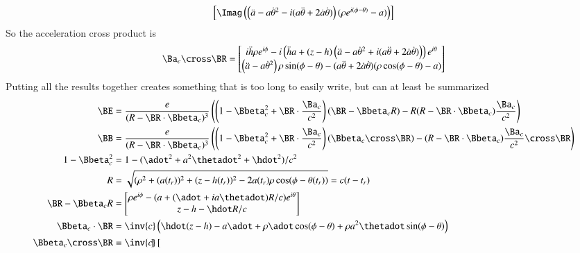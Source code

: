 {\begin{equation}
\begin{aligned}
\begin{bmatrix}
\Imag \left(
\left( \ddot{a} - a {\dot{\theta}}^2 - i ( a\ddot{\theta} + 2 \dot{a} \dot{\theta} ) \right) ( \rho e^{i(\phi -\theta)} - a )
\right)
\end{bmatrix} \\
\end{aligned}
\end{equation}
%
So the acceleration cross product is
%
\begin{equation}\label{eqn:relativisticElectrodynamicsExamReflection:980}
\Ba_c \cross \BR
=
\begin{bmatrix}
i \ddot{h} \rho e^{i\phi}
- i \left( \ddot{h} a + (z - h) \left( \ddot{a} - a {\dot{\theta}}^2 + i ( a\ddot{\theta} + 2 \dot{a} \dot{\theta} ) \right) \right) e^{i\theta} \\
\left( \ddot{a} - a {\dot{\theta}}^2 \right) \rho \sin(\phi - \theta)
-( a\ddot{\theta} + 2 \dot{a} \dot{\theta} ) (\rho \cos(\phi -\theta) - a)
\end{bmatrix}
\end{equation}
%
Putting all the results together creates something that is too long to easily write, but can at least be summarized
%
\begin{equation}\label{eqn:relativisticElectrodynamicsExamReflection:990}
\begin{aligned}
\BE
&=
\frac{e}{(R - \BR \cdot \Bbeta_c)^3}\left(
\left(1 - \Bbeta_c^2 + \BR \cdot \frac{\Ba_c}{c^2}
\right) (\BR - \Bbeta_c R)
- R(R - \BR \cdot \Bbeta_c) \frac{\Ba_c}{c^2}
\right) \\
\BB
&=
\frac{e}{(R - \BR \cdot \Bbeta_c)^3}\left(
\left(1 - \Bbeta_c^2 + \BR \cdot \frac{\Ba_c}{c^2}
\right) (\Bbeta_c \cross \BR)
- (R - \BR \cdot \Bbeta_c) \frac{\Ba_c}{c^2} \cross \BR
\right) \\
1 - \Bbeta_c^2 &= 1 - (\adot^2 + a^2 \thetadot^2 + \hdot^2)/c^2 \\
R &= \sqrt{(\rho^2 + (a(t_r))^2 + (z-h(t_r))^2 - 2 a(t_r) \rho \cos(\phi - \theta(t_r))} = c( t - t_r) \\
\BR - \Bbeta_c R &=
\begin{bmatrix}
\rho e^{i\phi} - (a + (\adot + i a\thetadot) R/c) e^{i\theta} \\
z - h - \hdot R/c
\end{bmatrix} \\
\Bbeta_c \cdot \BR &= \inv{c}\left( \hdot (z - h) -a \adot + \rho \adot \cos(\phi- \theta) + \rho a^2 \thetadot \sin(\phi - \theta) \right) \\
\Bbeta_c \cross \BR
&=
\inv{c}
\begin{bmatrix}

\end{bmatrix}
\end{aligned}
\end{equation}}
